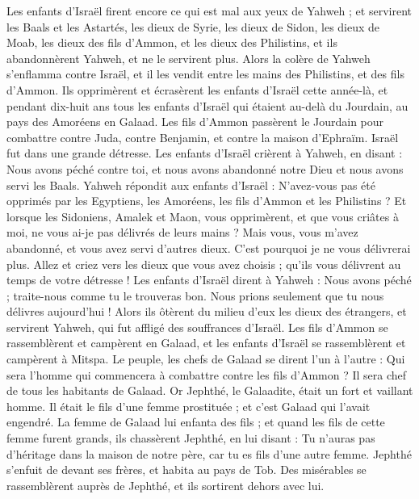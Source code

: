 \begin{multicols}{2}
Les enfants d'Israël firent encore ce qui est mal aux yeux de Yahweh ; et servirent les Baals et les Astartés, les dieux de Syrie, les dieux de Sidon, les dieux de Moab, les dieux des fils d'Ammon, et les dieux des Philistins, et ils abandonnèrent Yahweh, et ne le servirent plus.
Alors la colère de Yahweh s'enflamma contre Israël, et il les vendit entre les mains des Philistins, et des fils d'Ammon.
Ils opprimèrent et écrasèrent les enfants d'Israël cette année-là, et pendant dix-huit ans tous les enfants d'Israël qui étaient au-delà du Jourdain, au pays des Amoréens en Galaad.
Les fils d'Ammon passèrent le Jourdain pour combattre contre Juda, contre Benjamin, et contre la maison d'Ephraïm. Israël fut dans une grande détresse.
Les enfants d'Israël crièrent à Yahweh, en disant : Nous avons péché contre toi, et nous avons abandonné notre Dieu et nous avons servi les Baals.
Yahweh répondit aux enfants d'Israël : N'avez-vous pas été opprimés par les Egyptiens, les Amoréens, les fils d'Ammon et les Philistins ?
Et lorsque les Sidoniens, Amalek et Maon, vous opprimèrent, et que vous criâtes à moi, ne vous ai-je pas délivrés de leurs mains ?
Mais vous, vous m'avez abandonné, et vous avez servi d'autres dieux. C'est pourquoi je ne vous délivrerai plus.
Allez et criez vers les dieux que vous avez choisis ; qu'ils vous délivrent au temps de votre détresse !
Les enfants d'Israël dirent à Yahweh : Nous avons péché ; traite-nous comme tu le trouveras bon. Nous prions seulement que tu nous délivres aujourd'hui !
Alors ils ôtèrent du milieu d'eux les dieux des étrangers, et servirent Yahweh, qui fut affligé des souffrances d'Israël.
Les fils d'Ammon se rassemblèrent et campèrent en Galaad, et les enfants d'Israël se rassemblèrent et campèrent à Mitspa.
Le peuple, les chefs de Galaad se dirent l'un à l'autre : Qui sera l'homme qui commencera à combattre contre les fils d'Ammon ? Il sera chef de tous les habitants de Galaad.
\VerseOne{}Or Jephthé, le Galaadite, était un fort et vaillant homme. Il était le fils d'une femme prostituée ; et c'est Galaad qui l'avait engendré.
La femme de Galaad lui enfanta des fils ; et quand les fils de cette femme furent grands, ils chassèrent Jephthé, en lui disant : Tu n'auras pas d'héritage dans la maison de notre père, car tu es fils d'une autre femme.
Jephthé s'enfuit de devant ses frères, et habita au pays de Tob. Des misérables se rassemblèrent auprès de Jephthé, et ils sortirent dehors avec lui.

\end{multicols}
